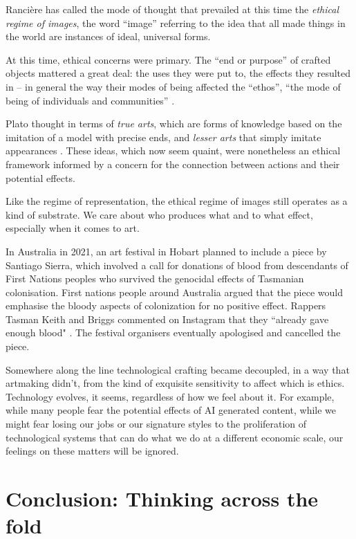 \documentclass[letter:wpaper]{article}
\begin{document}
    Rancière has called the mode of thought that prevailed at this time the \emph{ethical regime of images}, the word ``image'' referring to the idea that all made things in the world are instances of ideal, universal forms.

    At this time, ethical concerns were primary. The ``end or purpose'' of crafted objects mattered a great deal: the uses they were put to, the effects they resulted in -- in general the way their modes of being affected the ``ethos'', ``the mode of being of individuals and communities'' \citep[pp.20–21]{RancierPltcsOfThAsthtcs2004}.

    Plato thought in terms of \emph{true arts}, which are forms of knowledge based on the imitation of a model with precise ends, and \emph{lesser arts} that simply imitate appearances \citep[p.20]{RancierPltcsOfThAsthtcs2004}. These ideas, which now seem quaint, were nonetheless an ethical framework informed by a concern for the connection between actions and their potential effects.

    Like the regime of representation, the ethical regime of images still operates as a kind of substrate. We care about who produces what and to what effect, especially when it comes to art.
    
    In Australia in 2021, an art festival in Hobart planned to include a piece by Santiago Sierra, which involved a call for donations of blood from descendants of First Nations peoples who survived the genocidal effects of Tasmanian colonisation. First nations people around Australia argued that the piece would emphasise the bloody aspects of colonization for no positive effect. Rappers Tasman Keith and Briggs commented on Instagram that they ``already gave enough blood" \citep{DrkMfBld2021}. The festival organisers eventually apologised and cancelled the piece.
    
    Somewhere along the line technological crafting became decoupled, in a way that artmaking didn't, from the kind of exquisite sensitivity to affect which is ethics. Technology evolves, it seems, regardless of how we feel about it. For example, while many people fear the potential effects of AI generated content, while we might fear losing our jobs or our signature styles to the proliferation of technological systems that can do what we do at a different economic scale, our feelings on these matters will be ignored.
    
\section{Conclusion: Thinking across the fold}
\end{document}
